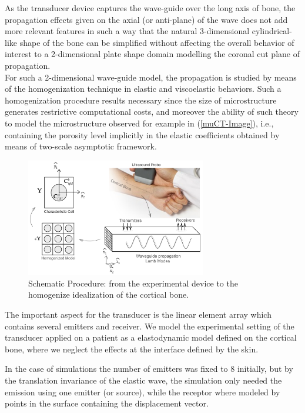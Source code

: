 As the transducer device captures the wave-guide over the long axis of bone, the propagation effects given on the axial (or anti-plane) of the wave does not add more relevant features in such a way that the natural 3-dimensional cylindrical-like shape of the bone can be simplified without affecting the overall behavior of interest to a 2-dimensional plate shape domain modelling the coronal cut plane of propagation. \\
For such a 2-dimensional wave-guide model, the propagation is studied by means of the homogenization technique in elastic and viscoelastic behaviors. Such a homogenization procedure results necessary since the size of microstructure generates restrictive computational costs, and moreover the ability of such theory to model the microstructure observed for example in (\ref{muCT-Image}), i.e., containing the porosity level implicitly in the elastic coefficients obtained by means of two-scale asymptotic framework.


\begin{figure}[!h]
	\centering
	\includegraphics[width=0.7\textwidth]{images/ImgExt/SchematicPropagation.png}
	\caption{Schematic Procedure: from the experimental device to the homogenize idealization of the cortical bone.}
	\label{SchematicProp&Hom}
\end{figure} 

The important aspect for the transducer is the linear element array which contains several emitters and receiver. We model the experimental setting of the transducer applied on a patient as a elastodynamic model defined on the cortical bone, where we neglect the effects at the interface defined by the skin. 

In the case of simulations the number of emitters was fixed to 8 initially, but by the translation invariance of the elastic wave, the simulation only needed the emission using one emitter (or source), while the receptor where modeled by points in the surface containing the displacement vector.

